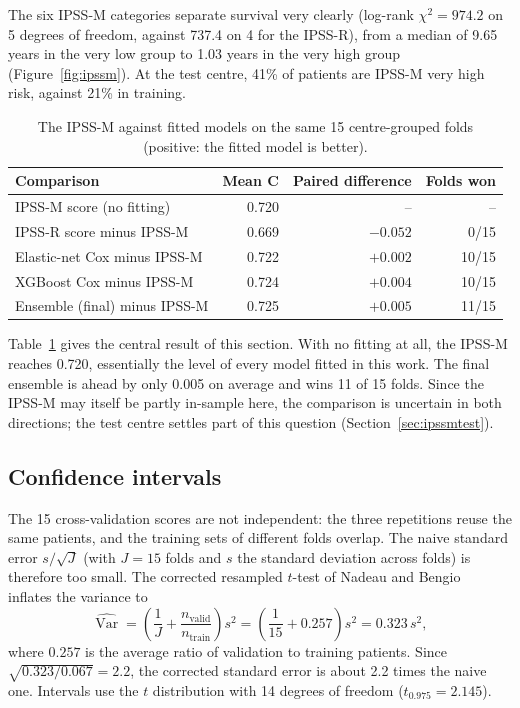 \documentclass[11pt,a4paper]{article}
\begin{document}
The six IPSS-M categories separate survival very clearly (log-rank $\chi^2 = 974.2$ on 5
degrees of freedom, against 737.4 on 4 for the IPSS-R), from a median of 9.65 years in the
very low group to 1.03 years in the very high group (Figure~\ref{fig:ipssm}). At the test
centre, 41\% of patients are IPSS-M very high risk, against 21\% in training.

\begin{table}[H]
\centering
\caption{The IPSS-M against fitted models on the same 15 centre-grouped folds (positive:
the fitted model is better).}
\label{tab:ipssmcv}
\begin{tabular}{lrrr}
\toprule
Comparison & Mean C & Paired difference & Folds won \\
\midrule
IPSS-M score (no fitting)          & 0.720 & --        & --    \\
IPSS-R score minus IPSS-M          & 0.669 & $-0.052$  & 0/15  \\
Elastic-net Cox minus IPSS-M       & 0.722 & $+0.002$  & 10/15 \\
XGBoost Cox minus IPSS-M           & 0.724 & $+0.004$  & 10/15 \\
Ensemble (final) minus IPSS-M      & 0.725 & $+0.005$  & 11/15 \\
\bottomrule
\end{tabular}
\end{table}

Table~\ref{tab:ipssmcv} gives the central result of this section. With no fitting at all,
the IPSS-M reaches 0.720, essentially the level of every model fitted in this work. The
final ensemble is ahead by only 0.005 on average and wins 11 of 15 folds. Since the IPSS-M
may itself be partly in-sample here, the comparison is uncertain in both directions; the
test centre settles part of this question (Section~\ref{sec:ipssmtest}).

\subsection{Confidence intervals}
The 15 cross-validation scores are not independent: the three repetitions reuse the same
patients, and the training sets of different folds overlap. The naive standard error
$s/\sqrt{J}$ (with $J = 15$ folds and $s$ the standard deviation across folds) is
therefore too small. The corrected resampled $t$-test of Nadeau and
Bengio~\cite{nadeau2003} inflates the variance to
\[
\widehat{\operatorname{Var}} = \left(\frac{1}{J} + \frac{n_{\text{valid}}}{n_{\text{train}}}\right) s^2
= \left(\frac{1}{15} + 0.257\right) s^2 = 0.323\, s^2,
\]
where $0.257$ is the average ratio of validation to training patients. Since
$\sqrt{0.323/0.067} = 2.2$, the corrected standard error is about 2.2 times the naive one.
Intervals use the $t$ distribution with 14 degrees of freedom ($t_{0.975} = 2.145$).
\end{document}

